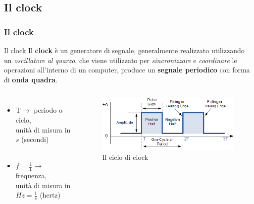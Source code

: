 \subsection[Il clock]{Il clock}
\begin{frame}
	\frametitle{Il clock}
	
	\begin{block}{Il clock}
		Il \textbf{clock} è un generatore di segnale, generalmente realizzato utilizzando un \textit{oscillatore al quarzo}, che viene utilizzato per \textit{sincronizzare} e \textit{coordinare} le operazioni all'interno di un computer, produce un \textbf{segnale periodico} con forma di \textbf{onda quadra}.
	\end{block}
	
	\begin{columns}
		\begin{itemize}
			\item $\mathrm{T} \rightarrow $ periodo o ciclo,\\
			unità di misura in\\
			$s$ (secondi)\\~\\
			\item $f = \frac{1}{\mathrm{T}} \rightarrow$ frequenza,\\
			unità di misura in $Hz = \frac{1}{s}$ (hertz)
		\end{itemize}
		
		\begin{figure}[!htbp]
			\centering 
			\includegraphics[width=1.0\linewidth]{images/2_elettronica/clock.png}
			\caption{Il ciclo di clock}
		\end{figure}
		
	\end{columns}
	
\end{frame}


